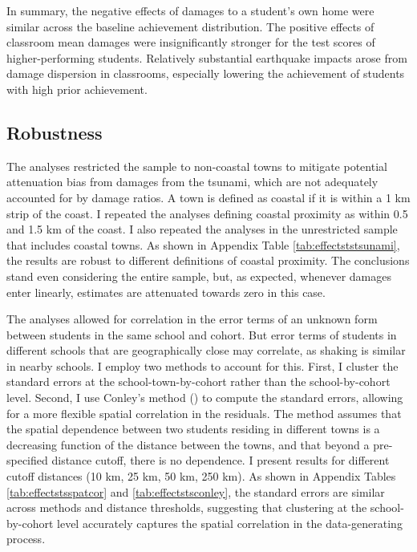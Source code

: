 In summary, the negative effects of damages to a student's own home were similar across the baseline achievement distribution. The positive effects of classroom mean damages were insignificantly stronger for the test scores of higher-performing students. Relatively substantial earthquake impacts arose from damage dispersion in classrooms, especially lowering the achievement of students with high prior achievement.\par 





\subsection{Robustness}\label{sec:robustness}

The analyses restricted the sample to non-coastal towns to mitigate potential attenuation bias from damages from the tsunami, which are not adequately accounted for by damage ratios. A town is defined as coastal if it is within a 1 km strip of the coast. I repeated the analyses defining coastal proximity as within 0.5 and 1.5 km of the coast. I also repeated the analyses in the unrestricted sample that includes coastal towns. As shown in Appendix Table \ref{tab:effectststsunami}, the results are robust to different definitions of coastal proximity. The conclusions stand even considering the entire sample, but, as expected, whenever damages enter linearly, estimates are attenuated towards zero in this case.\par 



The analyses allowed for correlation in the error terms of an unknown form between students in the same school and cohort. But error terms of students in different schools that are geographically close may correlate, as shaking is similar in nearby schools. I employ two methods to account for this. First, I cluster the standard errors at the school-town-by-cohort rather than the school-by-cohort level. Second, I use Conley's method (\cite{conley1999gmm}) to compute the standard errors, allowing for a more flexible spatial correlation in the residuals. The method assumes that the spatial dependence between two students residing in different towns is a decreasing function of the distance between the towns, and that beyond a pre-specified distance cutoff, there is no dependence. I present results for different cutoff distances (10 km, 25 km, 50 km, 250 km). As shown in Appendix Tables \ref{tab:effectstsspatcor} and \ref{tab:effectstsconley}, the standard errors are similar across methods and distance thresholds, suggesting that clustering at the school-by-cohort level accurately captures the spatial correlation in the data-generating process. 






